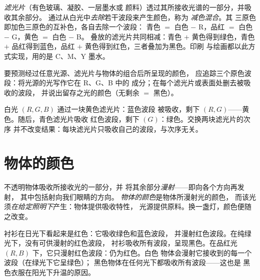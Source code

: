 \begin{definition}[减色混合]\label{def:g11:color-light-sources:subtractive}
\emph{滤光片}（有色玻璃、凝胶、一层墨水或
颜料）透过其所接收光谱的一部分，并吸收其余部分。
通过从白光中\emph{去除}若干波段来产生颜色，称为
\emph{减色混合}。其
三原色即加色三原色的互补色，各自去除一个波段：
青色 $=$ 白色 $-$ R，品红 $=$ 白色 $-$ G，黄色 $=$ 白色 $-$ B。
叠放的滤光片共同相减：青色 $+$ 黄色得到绿色，青色
$+$ 品红得到蓝色，品红 $+$ 黄色得到红色，三者叠加为黑色。印刷
与绘画都以此方式实现，用的是 C、M、Y 墨水。
\end{definition}

\begin{method}[光谱跟踪法]\label{met:g11:color-light-sources:bookkeeping}
要预测经过任意光源、滤光片与物体的组合后所呈现的颜色，
应追踪三个原色波段：将光源的光写作它在 R、G、B 中的
成分；在每个滤光片或表面处删去被吸收的波段，
并说出留存之光的颜色（无剩余 $=$ 黑色）。
\end{method}

\begin{example}[滤光片串联]\label{ex:g11:color-light-sources:chain}
白光 $(R, G, B)$ 通过一块黄色滤光片：蓝色波段
被吸收，剩下 $(R, G)$——黄色。随后，青色滤光片吸收
红色波段，剩下 $(G)$：绿色。交换两块滤光片的次序
并不改变结果：每块滤光片只吸收自己的波段，与次序无关。
\end{example}

\section{物体的颜色}

\begin{definition}[漫射与物体颜色]\label{def:g11:color-light-sources:objectcolor}
不透明物体吸收所接收光的一部分，并
将其余部分\emph{漫射}——即向各个方向再发射，
其中包括射向我们眼睛的方向。
\emph{物体的颜色}是物体所漫射光的颜色，
而该光须\emph{在给定照明下}产生：物体提供吸收特性，
光源提供原料。换一盏灯，颜色便随之改变。
\end{definition}

\begin{example}[红色衬衫]\label{ex:g11:color-light-sources:redshirt}
衬衫在日光下看起来是红色：它吸收绿色和蓝色波段，
并漫射红色波段。在纯绿光下，没有可供漫射的红色波段，
衬衫吸收所有波段，呈现黑色。在品红光
$(R, B)$ 下，它只漫射红色波段：仍为红色。白色
物体会漫射它接收到的每一个波段（在绿光下它呈绿色）；
黑色物体在任何光下都吸收所有波段——这也是
黑色衣服在阳光下升温的原因。
\end{example}


